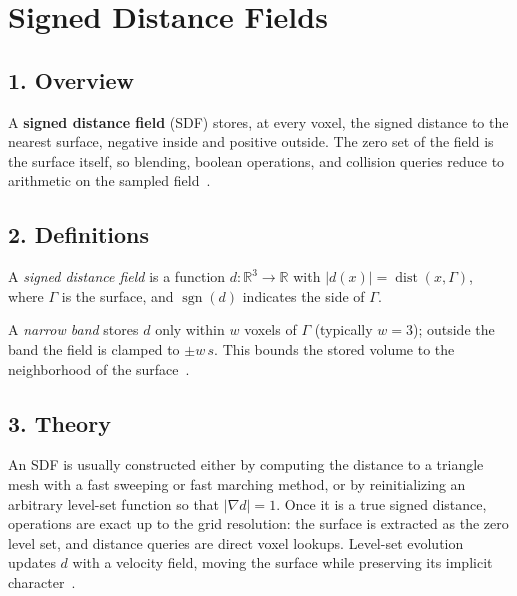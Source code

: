 \section{Signed Distance Fields}
\label{sec:sdf_voxel}

\subsection{1. Overview}
A \textbf{signed distance field} (SDF) stores,
at every voxel, the signed distance to the nearest surface, negative inside
and positive outside. The zero set of the field is the surface itself, so
blending, boolean operations, and collision queries reduce to arithmetic on
the sampled field~\cite{osher2003}.

\subsection{2. Definitions}

\begin{definition}\label{def:sdf_volume}
A \emph{signed distance field} is a function $d:\mathbb{R}^3 \to \mathbb{R}$ with
$|d(x)| = \operatorname{dist}(x, \Gamma)$, where $\Gamma$ is the surface,
and $\operatorname{sgn}(d)$ indicates the side of $\Gamma$.
\end{definition}

\begin{definition}\label{def:narrow_band}
A \emph{narrow band} stores $d$ only within $w$ voxels of $\Gamma$ (typically
$w = 3$); outside the band the field is clamped to $\pm w\,s$. This bounds
the stored volume to the neighborhood of the surface~\cite{osher2003,museth2013}.
\end{definition}

\subsection{3. Theory}
An SDF is usually constructed either by computing the distance to a triangle
mesh with a fast sweeping or fast marching method, or by reinitializing an
arbitrary level-set function so that $|\nabla d| = 1$. Once it is a true
signed distance, operations are exact up to the grid resolution: the surface
is extracted as the zero level set, and distance queries are direct voxel
lookups. Level-set evolution updates $d$ with a velocity field, moving the
surface while preserving its implicit character~\cite{osher2003}.

